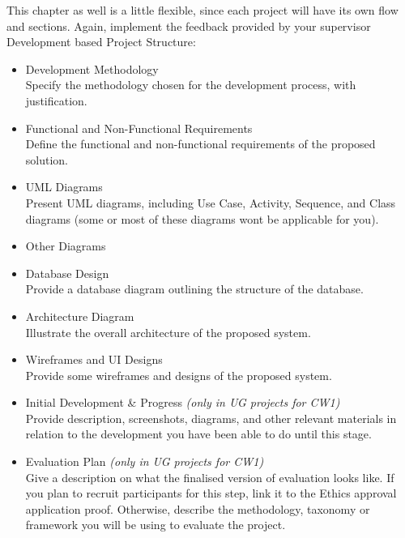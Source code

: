 This chapter as well is a little flexible, since each project will have its own flow and sections.
Again, implement the feedback provided by your supervisor \\

Development based Project Structure:
\begin{itemize}
    \item Development Methodology \\
Specify the methodology chosen for the development process, with justification.

    \item Functional and Non-Functional Requirements \\
Define the functional and non-functional requirements of the proposed solution.

    \item UML Diagrams \\
Present UML diagrams, including Use Case, Activity, Sequence, and Class diagrams (some or most of these diagrams wont be applicable for you).

    \item Other Diagrams
    \item Database Design \\
Provide a database diagram outlining the structure of the database.

    \item Architecture Diagram \\
Illustrate the overall architecture of the proposed system.

    \item Wireframes and UI Designs \\
Provide some wireframes and designs of the proposed system.

    \item Initial Development \& Progress \textit{(only in UG projects for CW1)} \\
Provide description, screenshots, diagrams, and other relevant materials in relation to the development you have been able to do until this stage.

    \item Evaluation Plan \textit{(only in UG projects for CW1)} \\
Give a description on what the finalised version of evaluation looks like. If you plan to recruit participants for this step, link it to the Ethics approval application proof. Otherwise, describe the methodology, taxonomy or framework you will be using to evaluate the project.
\end{itemize}

